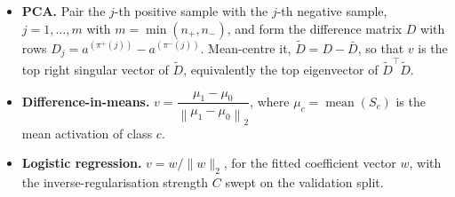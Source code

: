 \begin{itemize}
  \item \textbf{PCA.} Pair the $j$-th positive sample with the $j$-th negative sample,
  $j = 1, \dots, m$ with $m = \min(n_+, n_-)$, and form the difference matrix $D$ with
  rows $D_j = a^{(\pi^+(j))} - a^{(\pi^-(j))}$. Mean-centre it, $\tilde{D} = D - \bar{D}$,
  so that $v$ is the top right singular vector of $\tilde{D}$, equivalently the top
  eigenvector of $\tilde{D}^{\top}\tilde{D}$.

  \item \textbf{Difference-in-means.}
  $v = \dfrac{\mu_1 - \mu_0}{\left\|\mu_1 - \mu_0\right\|_2}$, where
  $\mu_c = \operatorname{mean}(S_c)$ is the mean activation of class $c$.

  \item \textbf{Logistic regression.} $v = w / \|w\|_2$, for the fitted coefficient
  vector $w$, with the inverse-regularisation strength $C$ swept on the validation split.
\end{itemize}
